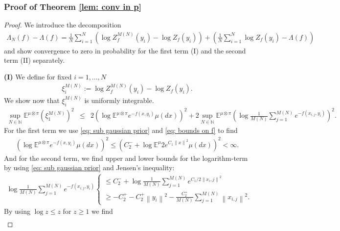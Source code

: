 \documentclass{amsart}
\theoremstyle{definition}
\newcommand{\E}{{\mathbb E}}
\newcommand{\norm}[1]{\left\|#1\right\|}
\newcommand{\Natural}{\mathbb{N}}
\begin{document}
\subsubsection*{Proof of Theorem \ref{lem: conv in p}}
\begin{proof}
   We introduce the decomposition
    \begin{align}\label{eq: decomp prob in p}
        \Lambda_{N}(f) - \Lambda(f) =   \frac{1}{N} \sum_{i=1}^N \left(\log Z_f^{M(N)}(y_i) - \log Z_f(y_i)\right)+ \left(\frac{1}{N} \sum_{i=1}^{N} \log Z_f(y_i) - \Lambda(f)\right)
    \end{align}
    and show convergence to zero in probability for the first term (I) and the second term (II) separately.
    
    \textbf{(I)} We define for fixed $i = 1, \ldots, N$ 
    \begin{eqnarray*}
        \xi_i^{M(N)}:= \log Z_f^{M(N)}(y_i) - \log Z_f(y_i).
    \end{eqnarray*}
     We show now that $\xi_i^{M(N)}$ is uniformly integrable.
    \begin{eqnarray*} 
            \sup_{N \in \Natural} \E^{\mu\otimes \pi} (\xi_1^{M(N)})^2 &\le& 2\left(\log \E^{\mu\otimes \pi} e^{-f(x, y_i)} \mu(dx)\right)^2 +2 \sup_{N \in \Natural} \E^{\mu\otimes \pi} \left(\log \frac{1}{M(N)} \sum_{j=1}^{M(N)} e^{-f(x_{i, j}, y_i)}\right)^2.
    \end{eqnarray*}
    For the first term we use \eqref{eq: sub gaussian prior} and \eqref{eq: bounds on f} to find
    \begin{eqnarray*}
        \left(\log \E^{\mu\otimes \pi} e^{-f(x, y_i)} \mu(dx)\right)^2 \le \left(C_2 ^- + \log \E^{\mu} 2e^{C_1 \norm{x}^2} \mu(dx) \right)^2 < \infty.
    \end{eqnarray*}
    And for the second term, we find upper and lower bounds for the logarithm-term by using \eqref{eq: sub gaussian prior} and Jensen's inequality:
    \begin{eqnarray*}
         \log \frac{1}{M(N)} \sum_{j=1}^{M(N)} e^{-f(x_{i, j}, y_i)} \begin{cases}
             \le C_2^- + \log \frac{1}{M(N)} \sum_{j=1}^{M(N)} e^{C_1/2 \norm{x_i, j}^2} \\
              \ge -C_2^+ - C_2^+ \norm{y_i}^2 - \frac{C_2^+}{M(N)} \sum_{j=1}^{M(N)} \norm{x_{i, j}}^2.
         \end{cases}  
    \end{eqnarray*}
    By using $\log z \le z$ for $z \ge 1$ we find
    \begin{eqnarray*}

\end{eqnarray*}
\end{proof}
\end{document}
